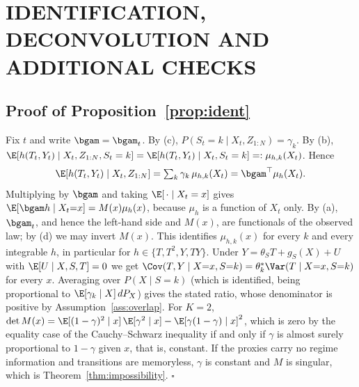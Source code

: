 \section{IDENTIFICATION, DECONVOLUTION AND ADDITIONAL CHECKS}
\label{app:ident}

\subsection{Proof of Proposition~\ref{prop:ident}}
Fix $t$ and write $\bgam=\bgam_t$. By (c), $P(S_t=k\mid X_t,Z_{1:N})=\gamma_k$. By (b), $\E[h(T_t,Y_t)\mid X_t,Z_{1:N},S_t=k]=\E[h(T_t,Y_t)\mid X_t,S_t=k]=:\mu_{h,k}(X_t)$. Hence
\[
\E[h(T_t,Y_t)\mid X_t,Z_{1:N}]=\textstyle\sum_k\gamma_k\,\mu_{h,k}(X_t)=\bgam^\top\mu_h(X_t).
\]
Multiplying by $\bgam$ and taking $\E[\,\cdot\mid X_t=x]$ gives $\E[\bgam h\mid X_t{=}x]=M(x)\mu_h(x)$, because $\mu_h$ is a function of $X_t$ only. By (a), $\bgam_t$, and hence the left-hand side and $M(x)$, are functionals of the observed law; by (d) we may invert $M(x)$. This identifies $\mu_{h,k}(x)$ for every $k$ and every integrable $h$, in particular for $h\in\{T,T^2,Y,TY\}$. Under $Y=\theta_ST+g_S(X)+U$ with $\E[U\mid X,S,T]=0$ we get $\Cov(T,Y\mid X{=}x,S{=}k)=\theta_k^*\Var(T\mid X{=}x,S{=}k)$ for every $x$. Averaging over $P(X\mid S{=}k)$ (which is identified, being proportional to $\E[\gamma_k\mid X]\,dP_X$) gives the stated ratio, whose denominator is positive by Assumption~\ref{ass:overlap}. For $K=2$, $\det M(x)=\E[(1-\gamma)^2\mid x]\,\E[\gamma^2\mid x]-\E[\gamma(1-\gamma)\mid x]^2$, which is zero by the equality case of the Cauchy--Schwarz inequality if and only if $\gamma$ is almost surely proportional to $1-\gamma$ given $x$, that is, constant. If the proxies carry no regime information and transitions are memoryless, $\gamma$ is constant and $M$ is singular, which is Theorem~\ref{thm:impossibility}. $\square$

